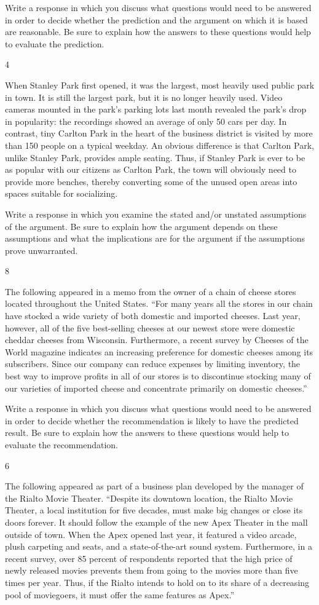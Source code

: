 \documentclass[]{article}
\begin{document}
Write a response in which you discuss what questions would need to be
answered in order to decide whether the prediction and the argument on
which it is based are reasonable. Be sure to explain how the answers to
these questions would help to evaluate the prediction.

4

When Stanley Park first opened, it was the largest, most heavily used
public park in town. It is still the largest park, but it is no longer
heavily used. Video cameras mounted in the park's parking lots last
month revealed the park's drop in popularity: the recordings showed an
average of only 50 cars per day. In contrast, tiny Carlton Park in the
heart of the business district is visited by more than 150 people on a
typical weekday. An obvious difference is that Carlton Park, unlike
Stanley Park, provides ample seating. Thus, if Stanley Park is ever to
be as popular with our citizens as Carlton Park, the town will obviously
need to provide more benches, thereby converting some of the unused open
areas into spaces suitable for socializing.

Write a response in which you examine the stated and/or unstated
assumptions of the argument. Be sure to explain how the argument depends
on these assumptions and what the implications are for the argument if
the assumptions prove unwarranted.

8

The following appeared in a memo from the owner of a chain of cheese
stores located throughout the United States. ``For many years all the
stores in our chain have stocked a wide variety of both domestic and
imported cheeses. Last year, however, all of the five best-selling
cheeses at our newest store were domestic cheddar cheeses from
Wisconsin. Furthermore, a recent survey by Cheeses of the World magazine
indicates an increasing preference for domestic cheeses among its
subscribers. Since our company can reduce expenses by limiting
inventory, the best way to improve profits in all of our stores is to
discontinue stocking many of our varieties of imported cheese and
concentrate primarily on domestic cheeses.''

Write a response in which you discuss what questions would need to be
answered in order to decide whether the recommendation is likely to have
the predicted result. Be sure to explain how the answers to these
questions would help to evaluate the recommendation.

6

The following appeared as part of a business plan developed by the
manager of the Rialto Movie Theater. ``Despite its downtown location,
the Rialto Movie Theater, a local institution for five decades, must
make big changes or close its doors forever. It should follow the
example of the new Apex Theater in the mall outside of town. When the
Apex opened last year, it featured a video arcade, plush carpeting and
seats, and a state-of-the-art sound system. Furthermore, in a recent
survey, over 85 percent of respondents reported that the high price of
newly released movies prevents them from going to the movies more than
five times per year. Thus, if the Rialto intends to hold on to its share
of a decreasing pool of moviegoers, it must offer the same features as
Apex.''
\end{document}
